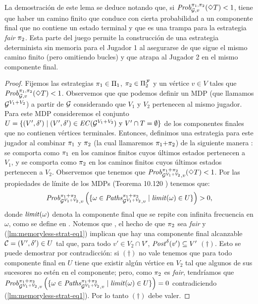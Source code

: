 La demostración de este lema se deduce notando que, si $\mathit{Prob}^{\pi_{1}, \pi_{2}}_{\mathcal{G}, v}(\Diamond T) < 1$, tiene que haber un camino finito que conduce con cierta probabilidad a un componente final que no contiene un estado terminal y que es una trampa para la estrategia \textit{fair} $\pi_{2}$. Esta parte del juego permite la construcción de una estrategia determinista sin memoria para el Jugador 1 al asegurarse de que sigue el mismo camino finito (pero omitiendo bucles) y que atrapa al Jugador 2 en el mismo componente final.
\iffalse
\begin{proof}
  Fijemos las estrategias $\pi_{1} \in \Pi_{1}$, $\pi_{2} \in
  \Pi^{\mathcal{F}}_{2}$ y un vértice $v \in V$ tales que
  $\mathit{Prob}^{\pi_{1}, \pi_{2}}_{\mathcal{G}, v}(\Diamond T) < 1$.
  Observemos que que podemos definir un MDP (que llamamos $\mathcal{G}^{V_1{+}V_2}$) a partir de
  $\mathcal{G}$ considerando que $V_1$ y $V_2$ pertenecen al mismo jugador.  Para este MDP consideremos el conjunto $U = \{ (V',\delta')
  \mid(V',\delta') \in \mathit{EC}(\mathcal{G}^{V_1{+}V_2}) \text{ y }
  V'\cap T = \emptyset \}$ de los componentes finales que no contienen vértices terminales. Entonces, definimos una estrategia para este jugador al combinar
  $\pi_{1}$ y $\pi_{2}$ (la cual llamaremos $\pi_{1}{+}\pi_{2}$) de la siguiente manera
  : se comporta como $\pi_{1}$ en los caminos finitos cuyos últimos estados pertenecen a $V_1$, y se comporta como $\pi_{2}$ en los caminos finitos cuyos últimos estados pertenecen a $V_2$. Observemos que tenemos que
  $\mathit{Prob}^{\pi_{1}{+}\pi_{2}}_{\mathcal{G}^{V_1+V_2},v}(\Diamond T) <
  1$. Por las propiedades de límite de los MDPs (Teorema 10.120 \cite{BaierK08})
  tenemos que:
  \begin{equation}\label{lm:memoryless-strat-eq1}
    \mathit{Prob}^{\pi_{1}{+}\pi_{2}}_{\mathcal{G}^{V_1+V_2},v} \left(\{ \omega \in \mathit{Paths}^{\pi_{1}{+}\pi_{2}}_{\mathcal{G}^{V_1+V_2},v} \mid \mathit{limit}(\omega)  \in U \}\right) > 0,
  \end{equation}
  donde $\mathit{limit}(\omega)$ denota la componente final que se repite con infinita frecuencia en $\omega$, como se define en \cite{BaierK08}.  Notemos que
  , el hecho de que $\pi_{2}$ sea \textit{fair} y
  (\ref{lm:memoryless-strat-eq1}) implican que hay una componente final alcanzable $\mathcal{C}= (V',\delta') \in U$ tal que, para todo
  $v' \in V_2 \cap V'$, $\mathit{Post}^\delta(v') \subseteq V'$ $(\dag)$.
  Esto se puede demostrar por contradicción: si $(\dag)$ no vale tenemos que para todo componente final en $U$ tiene que existir
  algún vértice en
  $V_2$ tal que algunos de sus sucesores no estén en el componente; pero,
  como $\pi_{2}$ es \textit{fair}, tendríamos que
  $\mathit{Prob}^{\pi_{1}{+}\pi_{2}}_{\mathcal{G}^{V_1+V_2},v} \left ( \{ \omega \in \mathit{Paths}^{\pi_{1}{+}\pi_{2}}_{\mathcal{G}^{V_1+V_2},v} \mid \mathit{limit}(\omega) \in U \}\right) = 0$
  contradiciendo (\ref{lm:memoryless-strat-eq1}). Por lo tanto $(\dag)$ debe valer.


\end{proof}

